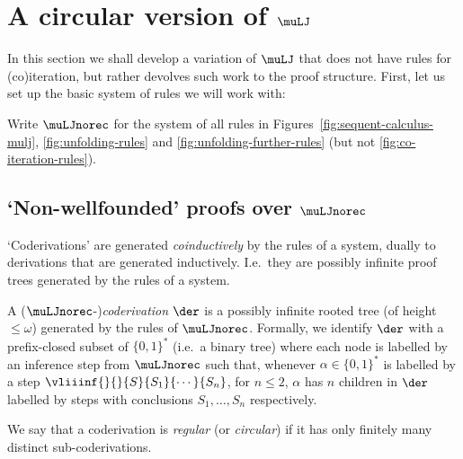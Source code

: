 \section{A circular version of $\muLJ$}
\label{sec:cmuLJ-prelims}

In this section we shall develop a variation of $\muLJ$ that does not have rules for (co)iteration, but rather devolves such work to the proof structure.
First, let us set up the basic system of rules we will work with:
\begin{definition}
Write $\muLJnorec$ for the system of all rules in Figures~\ref{fig:sequent-calculus-mulj}, \ref{fig:unfolding-rules} and \ref{fig:unfolding-further-rules} (but not \ref{fig:co-iteration-rules}).
\end{definition}


\subsection{`Non-wellfounded' proofs over $\muLJnorec$}

`Coderivations' are generated \emph{coinductively} by the rules of a system, dually to derivations that are generated inductively.
I.e.\ they are possibly infinite proof trees generated by the rules of a system.


\begin{defn}
[Coderivations]
A ($\muLJnorec$-)\emph{coderivation} $\der$ is a possibly infinite {rooted} tree (of height $\leq \omega$) generated by the rules of $\muLJnorec$.
Formally, we identify $\der$ with a prefix-closed subset of $ \{0,1\}^*$ (i.e.\ a binary tree) where each node  is labelled by an inference step from $\muLJnorec$ such that, whenever $\alpha\in \{0,1\}^*$ is labelled by a step $\vliiinf{}{}{S}{S_1}{\cdots}{S_n}$, for $n\leq 2$, $\alpha$ has $n$ children in $\der$ labelled by steps with conclusions $S_1, \dots, S_n$ respectively. 

We say that a coderivation is \emph{regular} (or \emph{circular}) if it has only finitely many distinct sub-coderivations.
\end{defn}


